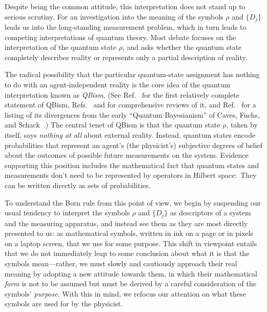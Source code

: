 \documentclass[%
 reprint,superscriptaddress,
 amsmath,amssymb,
 aps,pra, onecolumn, 12pt
]{revtex4-2}
\newcommand{\tit}[1]{\textit{#1}}
\begin{document}
Despite being the common attitude, this interpretation does not stand up to serious scrutiny. For an investigation into the meaning of the symbols $\rho$ and $\{ D_j \}$ leads us into the long-standing measurement problem, which in turn leads to competing interpretations of quantum theory. Most debate focuses on the interpretation of the quantum state $\rho$, and asks whether the quantum state completely describes reality or represents only a partial description of reality.

The radical possibility that the particular quantum-state assignment has nothing to do with an agent-independent reality is the core idea of the quantum interpretation known as \tit{QBism}. (See Ref.~\cite{Fuchs10a} for the first relatively complete statement of QBism, Refs.\ \cite{FuchsStacey2018} and \cite{FMS} for comprehensive reviews of it, and Ref.~\cite{Stacey2019} for a listing of its divergences from the early ``Quantum Bayesianism'' of Caves, Fuchs, and Schack~\cite{Caves02a}.) The central tenet of QBism is that the quantum state $\rho$, taken by itself, says \tit{nothing at all} about external reality. Instead, quantum states encode probabilities that represent an agent's (the physicist's) subjective degrees of belief about the outcomes of possible future measurements on the system.  Evidence supporting this position includes the mathematical fact that quantum states and measurements don't need to be represented by operators in Hilbert space:\ They can be written directly as sets of probabilities.

To understand the Born rule from this point of view, we begin by suspending our usual tendency to interpret the symbols $\rho$ and $\{ D_j \}$ as  descriptors of a system and the measuring apparatus, and instead see them as they are most directly presented to us: as mathematical symbols, written in ink on a page or in pixels on a laptop screen, that we use for some purpose. This shift in viewpoint entails that we do not immediately leap to some conclusion about what it is that the symbols mean---rather, we must slowly and cautiously approach their real meaning by adopting a new attitude towards them, in which their mathematical \tit{form} is not to be assumed but must be derived by a careful consideration of the symbols' \tit{purpose}. With this in mind, we refocus our attention on what these symbols are used for by the physicist.
\end{document}
